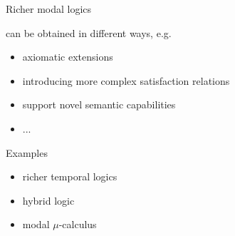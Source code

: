 \documentclass[aspectratio=169]{beamer}
\begin{document}
\begin{slide}{Richer modal logics}\label{s:40}
\small

can be obtained in different ways, e.g.

\begin{itemize}
\item axiomatic extensions
\item introducing more complex satisfaction relations
\item \alert{support novel semantic capabilities}
\item ...
\end{itemize}
 
 Examples
 \begin{itemize}
 \item richer temporal logics
\item hybrid logic
 \item modal $\mu$-calculus 
\end{itemize}
\end{slide}
\end{document}
